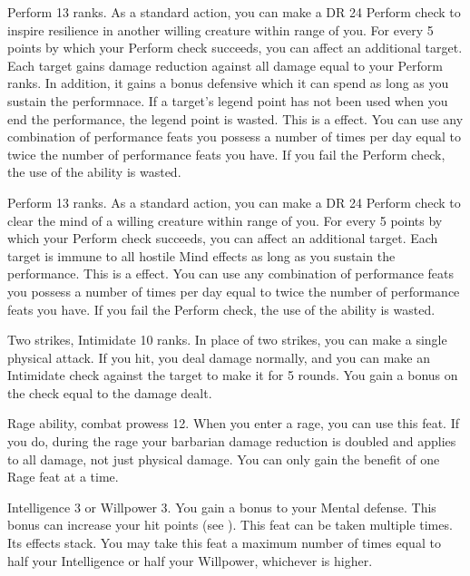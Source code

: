 \featpre Perform 13 ranks.
\featben As a standard action, you can make a DR 24 Perform check to inspire resilience in another willing creature within \rngmed range of you.
For every 5 points by which your Perform check succeeds, you can affect an additional target.
Each target gains damage reduction against all damage equal to your Perform ranks.
In addition, it gains a bonus defensive  which it can spend as long as you sustain the performnace.
If a target's legend point has not been used when you end the performance, the legend point is wasted.
This is a  effect.
 You can use any combination of performance feats you possess a number of times per day equal to twice the number of performance feats you have.
If you fail the Perform check, the use of the ability is wasted.

\featpre Perform 13 ranks.
\featben As a standard action, you can make a DR 24 Perform check to clear the mind of a willing creature within \rngmed range of you.
For every 5 points by which your Perform check succeeds, you can affect an additional target.
Each target is immune to all hostile Mind effects as long as you sustain the performance.
This is a  effect.
You can use any combination of performance feats you possess a number of times per day equal to twice the number of performance feats you have.
If you fail the Perform check, the use of the ability is wasted.

\featpres Two strikes, Intimidate 10 ranks.
\featben In place of two strikes, you can make a single physical attack.
If you hit, you deal damage normally, and you can make an Intimidate check against the target to make it \shaken for 5 rounds.
You gain a bonus on the check equal to the damage dealt.

\featpres Rage ability, combat prowess 12.
\featben When you enter a rage, you can use this feat. If you do, during the rage your barbarian damage reduction is doubled and applies to all damage, not just physical damage.
 You can only gain the benefit of one Rage feat at a time.

\featpre Intelligence 3 or Willpower 3.
\featben You gain a  bonus to your Mental defense.
This bonus can increase your hit points (see ).
 This feat can be taken multiple times. Its effects stack.
You may take this feat a maximum number of times equal to half your Intelligence or half your Willpower, whichever is higher.

